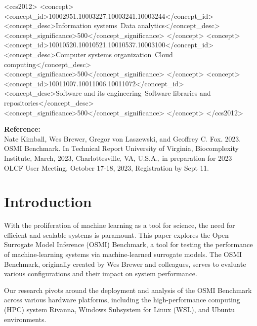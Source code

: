 \documentclass[sigplan,screen,noacm]{acmart}
\newcommand{\refBooktitle}{{\bf Reference:}\\ Nate Kimball, Wes Brewer, Gregor von Laszewski, and Geoffrey
C. Fox. 2023. OSMI Benchmark. In Technical Report University of Virginia, Biocomplexity Institute, March, 2023, Charlottesville, VA, U.S.A., in preparation for 2023 OLCF User Meeting,
October 17-18, 2023, Registration by Sept 11.}
\begin{document}
\begin{CCSXML}
<ccs2012>
   <concept>
       <concept_id>10002951.10003227.10003241.10003244</concept_id>
       <concept_desc>Information systems~Data analytics</concept_desc>
       <concept_significance>500</concept_significance>
       </concept>
   <concept>
       <concept_id>10010520.10010521.10010537.10003100</concept_id>
       <concept_desc>Computer systems organization~Cloud computing</concept_desc>
       <concept_significance>500</concept_significance>
       </concept>
   <concept>
       <concept_id>10011007.10011006.10011072</concept_id>
       <concept_desc>Software and its engineering~Software libraries and repositories</concept_desc>
       <concept_significance>500</concept_significance>
       </concept>
 </ccs2012>
\end{CCSXML}






\maketitle

\refBooktitle

\section{Introduction}

With the proliferation of machine learning as a tool for science, the need for efficient and scalable systems is paramount. This paper explores the Open Surrogate Model Inference (OSMI) Benchmark, a tool for testing the performance of machine-learning systems via machine-learned surrogate models. The OSMI Benchmark, originally created by Wes Brewer and colleagues, serves to evaluate various configurations and their impact on system performance.

Our research pivots around the deployment and analysis of the OSMI Benchmark across various hardware platforms, including the high-performance computing (HPC) system Rivanna, Windows Subsystem for Linux (WSL), and Ubuntu environments. 
\end{document}
